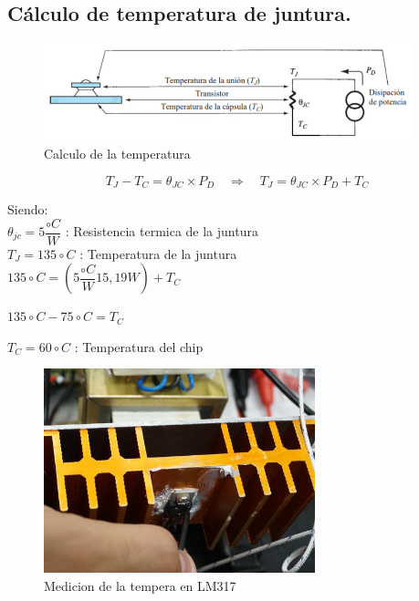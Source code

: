 \subsection{Cálculo de temperatura de juntura.}

\begin{figure}[H]
  \centering
  \includegraphics[width=0.95\textwidth]{images/calculoTemperatura.png}
  \caption{Calculo de la temperatura}
\end{figure}

\begin{equation}
  T_J - T_C = \theta_{JC} \times P_D \quad \Rightarrow \quad T_J = \theta_{JC} \times P_D + T_C
\end{equation}

Siendo: \\

$\theta_{jc} = 5\dfrac{\circ C}{W} $ : Resistencia termica de la juntura \\

$T_J = 135 \circ C$ : Temperatura de la juntura \\

$135 \circ C = (5 \dfrac{\circ C}{W} 15,19 W) + T_C $

$135 \circ C - 75 \circ C = T_C$

$T_C = 60 \circ C$ : Temperatura del chip

\begin{figure}[H]
  \centering
  \includegraphics[width=0.70\textwidth]{images/medicionTemperatura.png}
  \caption{Medicion de la tempera en LM317}
\end{figure}

